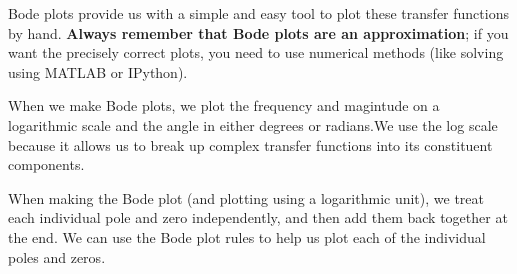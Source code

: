 
Bode plots provide us with a simple and easy tool to plot these transfer functions by hand. \textbf{Always remember that Bode plots are an approximation}; if you want the precisely correct plots, you need to use numerical methods (like solving using MATLAB or IPython).

When we make Bode plots, we plot the frequency and magintude on a logarithmic scale
and the angle in either degrees or radians.We use the log scale because it allows us to break up complex transfer functions into its constituent components. 

When making the Bode plot (and plotting using a logarithmic unit), we treat each individual pole and zero independently, and then add them back together at the end. We can use the Bode plot rules to help us plot each of the individual poles and zeros.

